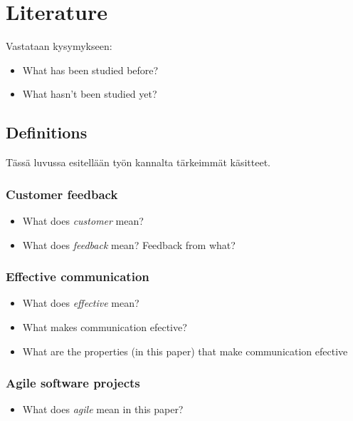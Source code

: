\documentclass[english,12pt,a4paper,pdftex]{article}
\begin{document}
\clearpage

\section{Literature}

Vastataan kysymykseen:

\begin{itemize}
\item What has been studied before?
\item What hasn't been studied yet?
\end{itemize}

\subsection{Definitions}

Tässä luvussa esitellään työn kannalta tärkeimmät käsitteet.

\subsubsection{Customer feedback}

\begin{itemize}
\item What does \textit{customer} mean?
\item What does \textit{feedback} mean? Feedback from what?
\end{itemize}

\subsubsection{Effective communication}

\begin{itemize}
\item What does \textit{effective} mean? 
\item What makes communication efective? 
\item What are the properties (in this paper) that make communication efective
\end{itemize}

\subsubsection{Agile software projects}

\begin{itemize}
\item What does \textit{agile} mean in this paper?
\end{itemize}
\end{document}
